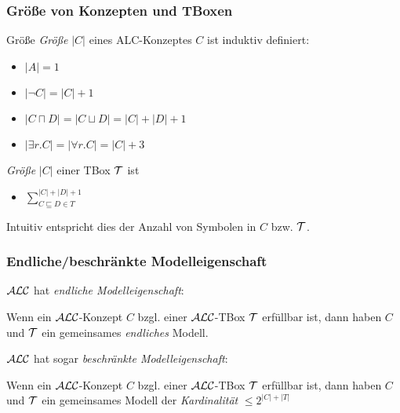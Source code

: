 \subsubsection{Größe von Konzepten und
TBoxen}\label{gruxf6uxdfe-von-konzepten-und-tboxen}

\begin{definition}{Größe}
\emph{Größe} $\left| C \right|$ eines ALC-Konzeptes $C$ ist induktiv
definiert:

\begin{itemize}
\item
  $\left| A \right| = 1$
\item
  $\left| \neg C \right| = \left| C \right| + 1$
\item
  $\left| C \sqcap D \right| = \left| C \sqcup D \right| = \left| C \right| + \left| D \right| + 1$
\item
  $\left| \exists r.C \right| = \left| \forall r.C \right| = \left| C \right| + 3$
\end{itemize}

\emph{Größe} $\left| C \right|$ einer TBox $\mathcal{T}$ ist

\begin{itemize}
\item
  $\sum_{C \sqsubseteq D \in T}^{\left| C \right| + \left| D \right| + 1}$
\end{itemize}
\end{definition}

Intuitiv entspricht dies der Anzahl von Symbolen in $C$ bzw. $\mathcal{T}$.

\subsubsection{Endliche/beschränkte Modelleigenschaft}

$\mathcal{A}\mathcal{L}\mathcal{C}$ hat \emph{endliche Modelleigenschaft}:

\begin{theorem}
Wenn ein $\mathcal{A}\mathcal{L}\mathcal{C}$-Konzept $C$ bzgl. einer $\mathcal{A}\mathcal{L}\mathcal{C}$-TBox $\mathcal{T}$ erfüllbar ist, dann haben $C$ und $\mathcal{T}$ ein gemeinsames \emph{endliches} Modell.
\end{theorem}

$\mathcal{A}\mathcal{L}\mathcal{C}$ hat sogar \emph{beschränkte Modelleigenschaft}:

\begin{theorem}
Wenn ein $\mathcal{A}\mathcal{L}\mathcal{C}$-Konzept $C$ bzgl. einer $\mathcal{A}\mathcal{L}\mathcal{C}$-TBox $\mathcal{T}$ erfüllbar ist, dann haben $C$ und $\mathcal{T}$ ein gemeinsames Modell der \emph{Kardinalität} $\leq 2^{|C|+|T|}$
\end{theorem}

